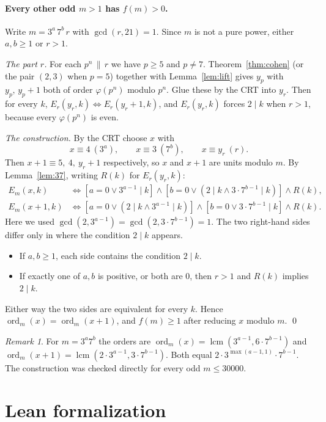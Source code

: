 \documentclass[11pt]{article}
\theoremstyle{remark}
\newtheorem{remark}[theorem]{Remark}
\newcommand{\ord}{\operatorname{ord}}
\newcommand{\lcm}{\operatorname{lcm}}
\begin{document}
\paragraph{Every other odd $m>1$ has $f(m)>0$.}
Write $m=3^a\,7^b\,r$ with $\gcd(r,21)=1$. Since $m$ is not a pure power, either $a,b\ge1$ or
$r>1$.

\emph{The part $r$.} For each $p^n\,\|\,r$ we have $p\ge5$ and $p\ne7$. Theorem~\ref{thm:cohen}
(or the pair $(2,3)$ when $p=5$) together with Lemma~\ref{lem:lift} gives $y_p$ with
$y_p,\,y_p+1$ both of order $\varphi(p^n)$ modulo $p^n$. Glue these by the CRT into $y_r$. Then
for every $k$, $E_r(y_r,k)\iff E_r(y_r+1,k)$, and $E_r(y_r,k)$ forces $2\mid k$ when $r>1$,
because every $\varphi(p^n)$ is even.

\emph{The construction.} By the CRT choose $x$ with
\[ x\equiv4\ (3^a),\qquad x\equiv3\ (7^b),\qquad x\equiv y_r\ (r). \]
Then $x+1\equiv5,\ 4,\ y_r+1$ respectively, so $x$ and $x+1$ are units modulo $m$. By
Lemma~\ref{lem:37}, writing $R(k)$ for $E_r(y_r,k)$:
\begin{align*}
E_m(x,k)&\iff [a=0 \vee 3^{a-1}\mid k]\wedge[b=0\vee (2\mid k\wedge 3\cdot7^{b-1}\mid k)]
  \wedge R(k),\\
E_m(x+1,k)&\iff [a=0 \vee (2\mid k\wedge 3^{a-1}\mid k)]\wedge[b=0\vee 3\cdot7^{b-1}\mid k]
  \wedge R(k).
\end{align*}
Here we used $\gcd(2,3^{a-1})=\gcd(2,3\cdot7^{b-1})=1$. The two right-hand sides differ only
in where the condition $2\mid k$ appears.
\begin{itemize}
  \item If $a,b\ge1$, each side contains the condition $2\mid k$.
  \item If exactly one of $a,b$ is positive, or both are $0$, then $r>1$ and $R(k)$ implies
    $2\mid k$.
\end{itemize}
Either way the two sides are equivalent for every $k$. Hence $\ord_m(x)=\ord_m(x+1)$, and
$f(m)\ge1$ after reducing $x$ modulo $m$. \qed

\begin{remark}
For $m=3^a7^b$ the orders are
$\ord_m(x)=\lcm(3^{a-1},6\cdot7^{b-1})$ and $\ord_m(x+1)=\lcm(2\cdot3^{a-1},3\cdot7^{b-1})$.
Both equal $2\cdot3^{\max(a-1,1)}\cdot7^{b-1}$. The construction was checked directly for every
odd $m\le 30000$.
\end{remark}

\section{Lean formalization}
\end{document}
